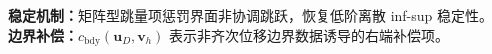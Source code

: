 \documentclass[notheorems]{beamer}
\begin{document}
\begin{frame}
{\begin{tcolorbox}
{\begin{columns}[T, totalwidth=\linewidth]
					\end{columns}
				}
			\end{tcolorbox}
			
			\begin{tcolorbox}[
				colback=structure.fg, colframe=structure.fg,
				coltext=white, boxrule=0pt, arc=3pt,
				top=2pt, bottom=2pt, left=8pt, right=8pt]
				{\fontsize{7.0}{9.2}\selectfont\sffamily
					\textbf{ 稳定机制：}矩阵型跳量项惩罚界面非协调跳跃，恢复低阶离散 inf-sup 稳定性。\\[-2pt]
					\textbf{ 边界补偿：}$c_{\mathrm{bdy}}(\boldsymbol{u}_D,\boldsymbol{v}_h)$ 表示非齐次位移边界数据诱导的右端补偿项。
				}
			\end{tcolorbox}
		}
		
	\end{frame}
	
	
\end{document}

